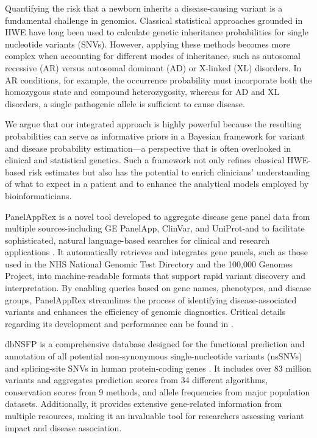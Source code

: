 Quantifying the risk that a newborn inherits a disease-causing variant is a fundamental challenge in genomics. Classical statistical approaches grounded in HWE \cite{MayoCentury2008, AbramovsHardyWeinberg2020} have long been used to calculate genetic inheritance probabilities for single nucleotide variants (SNVs). However, applying these methods becomes more complex when accounting for different modes of inheritance, such as autosomal recessive (AR) versus autosomal dominant (AD) or X-linked (XL) disorders. In AR conditions, for example, the occurrence probability must incorporate both the homozygous state and compound heterozygosity, whereas for AD and XL disorders, a single pathogenic allele is sufficient to cause disease.

We argue that our integrated approach is highly powerful because the resulting probabilities can serve as informative priors in a Bayesian framework for variant and disease probability estimation—a perspective that is often overlooked in clinical and statistical genetics. Such a framework not only refines classical HWE-based risk estimates but also has the potential to enrich clinicians’ understanding of what to expect in a patient and to enhance the analytical models employed by bioinformaticians.

PanelAppRex is a novel tool developed to aggregate disease gene panel data from multiple sources-including GE PanelApp, ClinVar, and UniProt-and to facilitate sophisticated, natural language-based searches for clinical and research applications
\cite{lawless_panelapprex_2025}. It automatically retrieves and integrates gene panels, such as those used in the NHS National Genomic Test Directory and the 100,000 Genomes Project, into machine-readable formats that support rapid variant discovery and interpretation. By enabling queries based on gene names, phenotypes, and disease groups, PanelAppRex streamlines the process of identifying disease-associated variants and enhances the efficiency of genomic diagnostics. Critical details regarding its development and performance can be found in \cite{martin_panelapp_2019, landrum_clinvar_2018, the_uniprot_consortium_uniprot_2025}.

dbNSFP is a comprehensive database designed for the functional prediction and annotation of all potential non-synonymous single-nucleotide variants (nsSNVs) and splicing-site SNVs in human protein-coding genes \cite{liu_dbnsfp_2020}. It includes over 83 million variants and aggregates prediction scores from 34 different algorithms, conservation scores from 9 methods, and allele frequencies from major population datasets. Additionally, it provides extensive gene-related information from multiple resources, making it an invaluable tool for researchers assessing variant impact and disease association.


